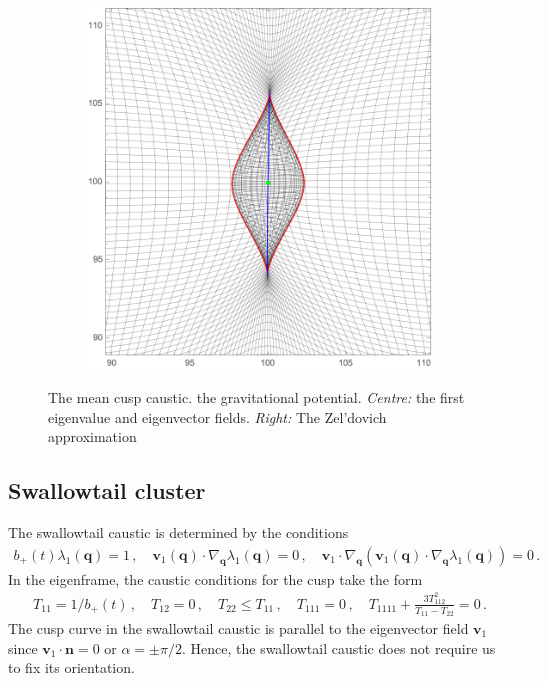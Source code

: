 \documentclass[a4paper, 11pt]{article}
\begin{document}
\begin{figure}
\begin{subfigure}[b]{0.32\textwidth}
\end{subfigure}~
\begin{subfigure}[b]{0.32\textwidth}
\includegraphics[width=\textwidth]{Cusp_mean_Z}
\end{subfigure}
\caption{The mean cusp caustic.  the gravitational potential. \textit{Centre:} the first eigenvalue and eigenvector fields. \textit{Right:} The Zel'dovich approximation}\label{fig:meanCusp}
\end{figure}

\subsection{Swallowtail cluster}
The swallowtail caustic is determined by the conditions
\begin{align}
b_+(t) \lambda_1(\bm{q}) = 1\,, \quad \bm{v}_1(\bm{q}) \cdot \nabla_{\bm{q}}\lambda_1(\bm{q}) = 0\,, \quad\bm{v}_1\cdot \nabla_{\bm{q}}( \bm{v}_1(\bm{q}) \cdot \nabla_{\bm{q}}\lambda_1(\bm{q})) = 0\,.
\end{align}
In the eigenframe, the caustic conditions for the cusp take the form
\begin{align}
T_{11}=1/b_+(t)\,, \quad T_{12}=0\,,\quad T_{22}\leq T_{11}\,,\quad T_{111}=0\,, \quad T_{1111}+\frac{3T_{112}^2}{T_{11}-T_{22}} =0\,.
\end{align}
The cusp curve in the swallowtail caustic is parallel to the eigenvector field $\bm{v}_1$ since $\bm{v}_1 \cdot \bm{n}=0$ or $\alpha = \pm \pi/2$. Hence, the swallowtail caustic does not require us to fix its orientation.
\end{document}
